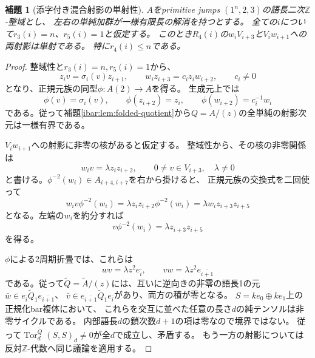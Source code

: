 \documentclass[11pt,a4paper]{ltjsarticle}
\newtheorem{lemma}[theorem]{補題}
\theoremstyle{definition}
\begin{document}
\begin{lemma}[添字付き混合射影の単射性]
\label{ibar:lem:mixed-injective}
$A$をprimitive jumps $(1^n,2,3)$の語長二次$\mathbb Z$-整域とし、
左右の単純加群が一様有限長の解消を持つとする。
全ての$i$について$r_3(i)=n$、$r_5(i)=1$と仮定する。
このとき$R_4(i)$の$w_iV_{i+3}$と$V_iw_{i+1}$への両射影は単射である。
特に$r_4(i)\le n$である。
\end{lemma}
\begin{proof}
整域性と$r_3(i)=n,r_5(i)=1$から、
\[
z_i v=\sigma_i(v)z_{i+1},\qquad
w_i z_{i+3}=c_i z_i w_{i+2},\qquad c_i\ne0
\]
となり、正規元族の同型$\phi:A(2)\to A$を得る。
生成元上では
\[
\phi(v)=\sigma_i(v),\qquad
\phi(z_{i+2})=z_i,\qquad
\phi(w_{i+2})=c_i^{-1}w_i
\]
である。従って補題\ref{ibar:lem:folded-quotient}から$Q=A/(z)$の全単純の射影次元は一様有界である。

$V_iw_{i+1}$への射影に非零の核があると仮定する。
整域性から、その核の非零関係は
\[
w_i v=\lambda z_i z_{i+2},\qquad
0\ne v\in V_{i+3},\quad\lambda\ne0
\]
と書ける。$\phi^{-2}(w_i)\in A_{i+4,i+7}$を右から掛けると、
正規元族の交換式を二回使って
\[
w_i v\phi^{-2}(w_i)
=\lambda z_i z_{i+2}\phi^{-2}(w_i)
=\lambda w_i z_{i+3}z_{i+5}
\]
となる。左端の$w_i$を約分すれば
\[
v\phi^{-2}(w_i)=\lambda z_{i+3}z_{i+5}
\]
を得る。

$\phi$による2周期折畳では、これらは
\[
wv=\lambda z^2e_{\bar i},\qquad
vw=\lambda z^2e_{\overline{i+1}}
\]
である。従って$\widetilde Q=\widetilde A/(z)$には、互いに逆向きの非零の語長1の元
$\bar w\in e_{\bar i}\widetilde Q_1e_{\overline{i+1}}$、
$\bar v\in e_{\overline{i+1}}\widetilde Q_1e_{\bar i}$があり、両方の積が零となる。
$S=ke_0\oplus ke_1$上の正規化bar複体において、
これらを交互に並べた任意の長さ$d$の純テンソルは非零サイクルである。
内部語長$d$の鎖次数$d+1$の項は零なので境界ではない。
従って$\operatorname{Tor}^{\widetilde Q}_d(S,S)_d\ne0$が全$d$で成立し、矛盾する。
もう一方の射影については反対$\mathbb Z$-代数へ同じ議論を適用する。
\end{proof}
\end{document}
